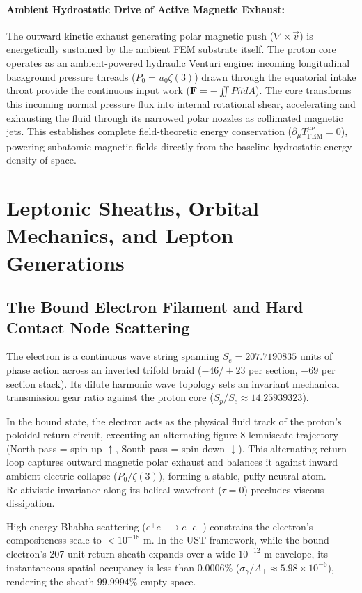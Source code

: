 \documentclass[11pt,a4paper]{article}
\begin{document}
	\paragraph{Ambient Hydrostatic Drive of Active Magnetic Exhaust:}
	The outward kinetic exhaust generating polar magnetic push ($\nabla \times \vec{v}$) is energetically sustained by the ambient FEM substrate itself. The proton core operates as an ambient-powered hydraulic Venturi engine: incoming longitudinal background pressure threads ($P_0 = u_0 \zeta(3)$) drawn through the equatorial intake throat provide the continuous input work ($\mathbf{F} = -\iint P \hat{n} dA$). The core transforms this incoming normal pressure flux into internal rotational shear, accelerating and exhausting the fluid through its narrowed polar nozzles as collimated magnetic jets. This establishes complete field-theoretic energy conservation ($\partial_\mu T^{\mu\nu}_{\text{FEM}} = 0$), powering subatomic magnetic fields directly from the baseline hydrostatic energy density of space.
	
	\section{Leptonic Sheaths, Orbital Mechanics, and Lepton Generations}
	
	\subsection{The Bound Electron Filament and Hard Contact Node Scattering}
	The electron is a continuous wave string spanning $S_e = 207.7190835$ units of phase action across an inverted trifold braid ($-46/+23$ per section, $-69$ per section stack). Its dilute harmonic wave topology sets an invariant mechanical transmission gear ratio against the proton core ($S_p / S_e \approx 14.25939323$).
	
	In the bound state, the electron acts as the physical fluid track of the proton's poloidal return circuit, executing an alternating figure-8 lemniscate trajectory (North pass = spin up $\uparrow$, South pass = spin down $\downarrow$). This alternating return loop captures outward magnetic polar exhaust and balances it against inward ambient electric collapse ($P_0 / \zeta(3)$), forming a stable, puffy neutral atom. Relativistic invariance along its helical wavefront ($\tau = 0$) precludes viscous dissipation.
	
	High-energy Bhabha scattering ($e^+e^- \to e^+e^-$) constrains the electron's compositeness scale to $< 10^{-18}\text{ m}$. In the UST framework, while the bound electron's 207-unit return sheath expands over a wide $10^{-12}\text{ m}$ envelope, its instantaneous spatial occupancy is less than $0.0006\%$ ($\sigma_\gamma / A_{\top} \approx 5.98 \times 10^{-6}$), rendering the sheath $99.9994\%$ empty space.
	
\end{document}
